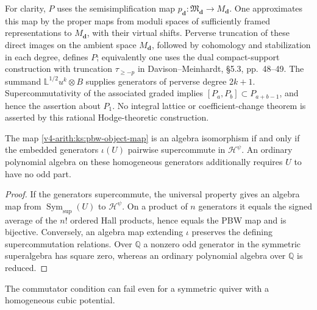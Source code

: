 For clarity, $P$ uses the semisimplification map
$p_{\mathbf d}:\mathfrak M_{\mathbf d}\to M_{\mathbf d}$.
One approximates this map by the proper maps from moduli spaces
of sufficiently framed representations to $M_{\mathbf d}$, with
their virtual shifts. Perverse truncation of these direct images
on the ambient space $M_{\mathbf d}$, followed by cohomology and
stabilization in each degree, defines $P$; equivalently one uses
the dual compact-support construction with truncation
$\tau_{\geq-p}$ in Davison--Meinhardt, \S5.3, pp.~48--49.
The summand $\mathbb L^{1/2}u^k\otimes B$ supplies generators of
perverse degree $2k+1$. Supercommutativity of the associated graded
implies $[P_a,P_b]\subset P_{a+b-1}$, and hence the assertion about
$P_1$. No integral lattice or coefficient-change theorem is asserted
by this rational Hodge-theoretic construction.

\begin{proposition}
\label{v4-arith:ks:pbw-multiplicative-criterion}
\ClaimStatusProvedHere{}
The map \eqref{v4-arith:ks:pbw-object-map} is an algebra isomorphism
if and only if the embedded generators $\iota(U)$ pairwise
supercommute in $\mathcal H^\psi$. An ordinary polynomial algebra
on these homogeneous generators additionally requires $U$ to have
no odd part.
\end{proposition}

\begin{proof}
If the generators supercommute, the universal property gives an
algebra map from $\operatorname{Sym}_{\mathrm{sup}}(U)$ to
$\mathcal H^\psi$. On a product of $n$ generators it equals the
signed average of the $n!$ ordered Hall products, hence equals the
PBW map and is bijective. Conversely, an algebra map extending
$\iota$ preserves the defining supercommutation relations.
Over $\mathbb Q$ a nonzero odd generator in the symmetric
superalgebra has square zero, whereas an ordinary polynomial
algebra over $\mathbb Q$ is reduced.
\end{proof}

The commutator condition can fail even for a symmetric quiver with
a homogeneous cubic potential.

